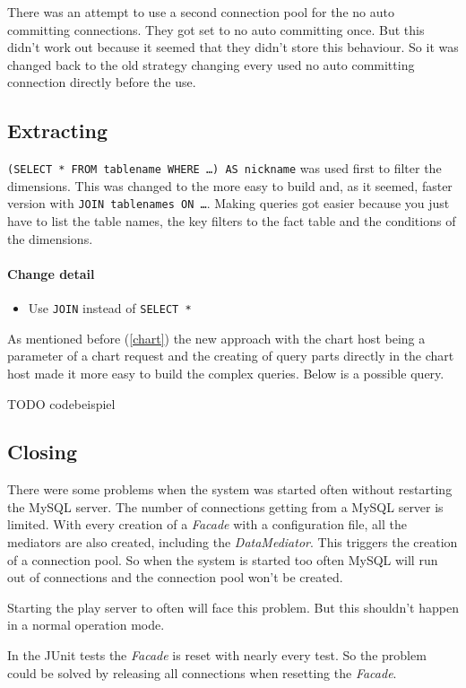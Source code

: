 There was an attempt to use a second connection pool for the no auto committing connections.
They got set to no auto committing once. But this didn't work out because it seemed
that they didn't store this behaviour. So it was changed back to the old strategy
changing every used no auto committing connection directly before the use.

\subsection{Extracting}
\texttt{(SELECT * FROM tablename WHERE \ldots) AS nickname} was used first to filter the dimensions.
This was changed to the more easy to build and, as it seemed, faster version with
\texttt{JOIN tablenames ON \ldots}. Making queries got easier because you just have to
list the table names, the key filters to the fact table and the conditions of the dimensions.

\paragraph{Change detail} 
\begin{itemize}
  \item Use \texttt{JOIN} instead of \texttt{SELECT *}
\end{itemize}

As mentioned before (\ref{chart}) the new approach with the chart host being a parameter
of a chart request and the creating of query parts directly in the chart host
made it more easy to build the complex queries. Below is a possible query.

TODO codebeispiel

\subsection{Closing}
There were some problems when the system was started often without restarting the MySQL server.
The number of connections getting from a MySQL server is limited. With every creation of a \textit{Facade}
with a configuration file, all the mediators are also created, including the \textit{DataMediator}.
This triggers the creation of a connection pool. So when the system is started too often
MySQL will run out of connections and the connection pool won't be created.

Starting the play server to often will face this problem. But this shouldn't happen in a normal
operation mode.

In the JUnit tests the \textit{Facade} is reset with nearly every test. So the problem could be
solved by releasing all connections when resetting the \textit{Facade}. 

